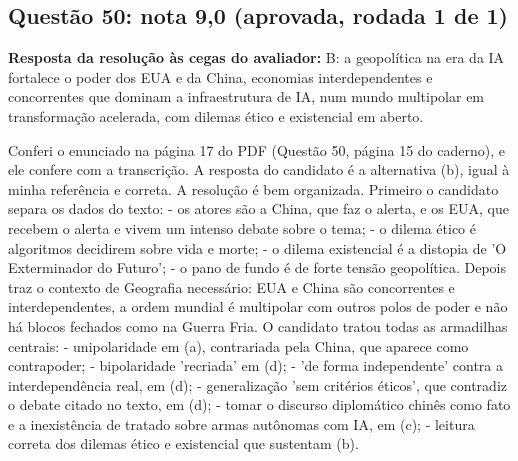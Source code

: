 \documentclass{article}%
\begin{document}
\subsection*{Questão 50: nota 9,0 (aprovada, rodada 1 de 1)}%
\textbf{Resposta da resolução às cegas do avaliador:} B: a geopolítica na era da IA fortalece o poder dos EUA e da China, economias interdependentes e concorrentes que dominam a infraestrutura de IA, num mundo multipolar em transformação acelerada, com dilemas ético e existencial em aberto.\par %
Conferi o enunciado na página 17 do PDF (Questão 50, página 15 do caderno), e ele confere com a transcrição. A resposta do candidato é a alternativa (b), igual à minha referência e correta.\newline%
\newline%
A resolução é bem organizada. Primeiro o candidato separa os dados do texto:\newline%
{-} os atores são a China, que faz o alerta, e os EUA, que recebem o alerta e vivem um intenso debate sobre o tema;\newline%
{-} o dilema ético é algoritmos decidirem sobre vida e morte;\newline%
{-} o dilema existencial é a distopia de 'O Exterminador do Futuro';\newline%
{-} o pano de fundo é de forte tensão geopolítica.\newline%
\newline%
Depois traz o contexto de Geografia necessário: EUA e China são concorrentes e interdependentes, a ordem mundial é multipolar com outros polos de poder e não há blocos fechados como na Guerra Fria.\newline%
\newline%
O candidato tratou todas as armadilhas centrais:\newline%
{-} unipolaridade em (a), contrariada pela China, que aparece como contrapoder;\newline%
{-} bipolaridade 'recriada' em (d);\newline%
{-} 'de forma independente' contra a interdependência real, em (d);\newline%
{-} generalização 'sem critérios éticos', que contradiz o debate citado no texto, em (d);\newline%
{-} tomar o discurso diplomático chinês como fato e a inexistência de tratado sobre armas autônomas com IA, em (c);\newline%
{-} leitura correta dos dilemas ético e existencial que sustentam (b).\newline%
\end{document}
